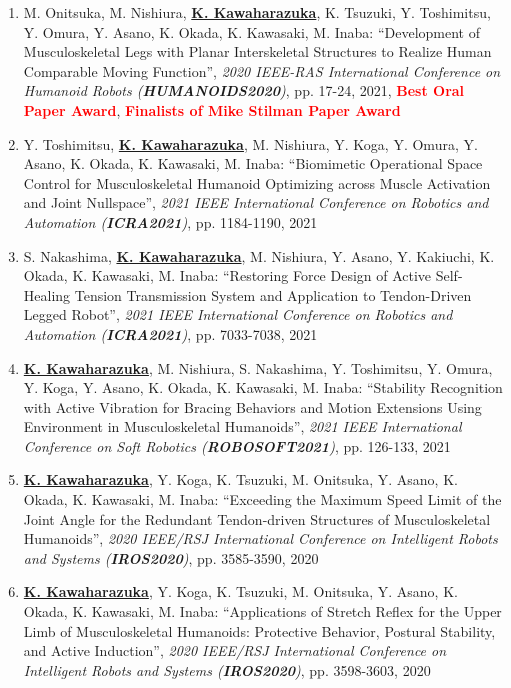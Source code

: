 \documentclass[letterpaper]{article}
\begin{document}
\begin{enumerate}
\item M. Onitsuka, M. Nishiura, \underline{\textbf{K. Kawaharazuka}}, K. Tsuzuki, Y. Toshimitsu, Y. Omura, Y. Asano, K. Okada, K. Kawasaki, M. Inaba: ``Development of Musculoskeletal Legs with Planar Interskeletal Structures to Realize Human Comparable Moving Function'', \textit{2020 IEEE-RAS International Conference on Humanoid Robots (\textit{\textbf{HUMANOIDS2020}})}, pp. 17-24, 2021, \textbf{\textcolor{red}{Best Oral Paper Award}}, \textbf{\textcolor{red}{Finalists of Mike Stilman Paper Award}}
\item Y. Toshimitsu, \underline{\textbf{K. Kawaharazuka}}, M. Nishiura, Y. Koga, Y. Omura, Y. Asano, K. Okada, K. Kawasaki, M. Inaba: ``Biomimetic Operational Space Control for Musculoskeletal Humanoid Optimizing across Muscle Activation and Joint Nullspace'', \textit{2021 IEEE International Conference on Robotics and Automation (\textit{\textbf{ICRA2021}})}, pp. 1184-1190, 2021
\item S. Nakashima, \underline{\textbf{K. Kawaharazuka}}, M. Nishiura, Y. Asano, Y. Kakiuchi, K. Okada, K. Kawasaki, M. Inaba: ``Restoring Force Design of Active Self-Healing Tension Transmission System and Application to Tendon-Driven Legged Robot'', \textit{2021 IEEE International Conference on Robotics and Automation (\textit{\textbf{ICRA2021}})}, pp. 7033-7038, 2021
\item \underline{\textbf{K. Kawaharazuka}}, M. Nishiura, S. Nakashima, Y. Toshimitsu, Y. Omura, Y. Koga, Y. Asano, K. Okada, K. Kawasaki, M. Inaba: ``Stability Recognition with Active Vibration for Bracing Behaviors and Motion Extensions Using Environment in Musculoskeletal Humanoids'', \textit{2021 IEEE International Conference on Soft Robotics (\textit{\textbf{ROBOSOFT2021}})}, pp. 126-133, 2021
\item \underline{\textbf{K. Kawaharazuka}}, Y. Koga, K. Tsuzuki, M. Onitsuka, Y. Asano, K. Okada, K. Kawasaki, M. Inaba: ``Exceeding the Maximum Speed Limit of the Joint Angle for the Redundant Tendon-driven Structures of Musculoskeletal Humanoids'', \textit{2020 IEEE/RSJ International Conference on Intelligent Robots and Systems (\textit{\textbf{IROS2020}})}, pp. 3585-3590, 2020
\item \underline{\textbf{K. Kawaharazuka}}, Y. Koga, K. Tsuzuki, M. Onitsuka, Y. Asano, K. Okada, K. Kawasaki, M. Inaba: ``Applications of Stretch Reflex for the Upper Limb of Musculoskeletal Humanoids: Protective Behavior, Postural Stability, and Active Induction'', \textit{2020 IEEE/RSJ International Conference on Intelligent Robots and Systems (\textit{\textbf{IROS2020}})}, pp. 3598-3603, 2020

\end{enumerate}
\end{document}
